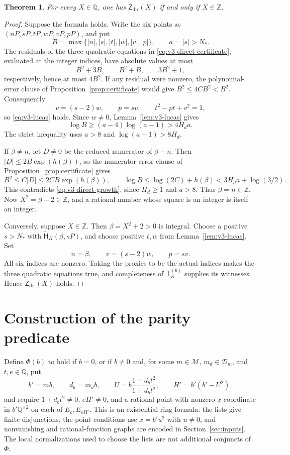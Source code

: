 \documentclass[11pt]{article}
\newtheorem{theorem}{Theorem}[section]
\theoremstyle{definition}\newtheorem{inputthm}[theorem]{Hypothesis}
\theoremstyle{remark}\newtheorem{remark}[theorem]{Remark}
\newcommand{\Q}{\mathbb Q}\newcommand{\Z}{\mathbb Z}
\begin{document}
\begin{theorem}\label{thm:v3-direct}
For every $X\in\Q$, one has $\mathsf Z_{\mathrm{dir}}(X)$ if and only
if $X\in\Z$.
\end{theorem}
\begin{proof}
Suppose the formula holds. Write the six points as
$(nP,sP,tP,wP,vP,pP)$, and put
\[
               B=\max\{|n|,|s|,|t|,|w|,|v|,|p|\},
               \qquad a=|s|>N_*.
\]
The residuals of the three quadratic equations in
\eqref{eq:v3-direct-certificate}, evaluated at the integer indices,
have absolute values at most
\[
                         B^2+3B,\qquad B^2+B,\qquad3B^2+1,
\]
respectively, hence at most $4B^2$. If any residual were nonzero,
the polynomial-error clause of Proposition~\ref{prop:certificate}
would give $B^2\le4CB^2<B^2$. Consequently
\[
                  v=(s-2)w,\qquad p=sv,\qquad t^2-pt+v^2=1,
\]
so \eqref{eq:v3-lucas} holds. Since $w\ne0$, Lemma~\ref{lem:v3-lucas}
gives
\begin{equation}\label{eq:v3-direct-growth}
              \log B\ge(a-4)\log(a-1)>4H_da.
\end{equation}
The strict inequality uses $a>8$ and $\log(a-1)>8H_d$.

If $\beta\ne n$, let $D\ne0$ be the reduced numerator of
$\beta-n$. Then $|D|\le2B\exp(h(\beta))$, so the numerator-error
clause of Proposition~\ref{prop:certificate} gives
\[
 B^2\le C|D|\le2CB\exp(h(\beta)),\qquad
 \log B\le\log(2C)+h(\beta)<3H_da+\log(3/2).
\]
This contradicts \eqref{eq:v3-direct-growth}, since $H_d\ge1$ and
$a>8$. Thus $\beta=n\in\Z$. Now $X^2=\beta-2\in\Z$, and a rational
number whose square is an integer is itself an integer.

Conversely, suppose $X\in\Z$. Then $\beta=X^2+2>0$ is integral.
Choose a positive $s>N_*$ with
$\widetilde{\mathsf H}_K(\beta,sP)$, and choose positive $t,w$ from
Lemma~\ref{lem:v3-lucas}. Set
\[
                   n=\beta,\qquad v=(s-2)w,\qquad p=sv.
\]
All six indices are nonzero. Taking the proxies to be the actual
indices makes the three quadratic equations true, and completeness
of $\mathsf T_K^{(6)}$ supplies its witnesses. Hence
$\mathsf Z_{\mathrm{dir}}(X)$ holds.
\end{proof}

\appendix
\section{Construction of the parity predicate}\label{app:parity}
Define $\Phi(b)$ to hold if $b=0$, or if $b\ne0$ and, for some
$m\in\mathcal M$, $m_d\in\mathcal D_m$, and $t,e\in\Q$, put
\begin{equation}\label{eq:restricted-phi}
 b'=mb,\qquad d_b=m_db,\qquad
 U=b\frac{1-d_bt^2}{1+d_bt^2},\qquad H'=b'(b'-U^2),
\end{equation}
and require $1+d_bt^2\ne0$, $eH'\ne0$, and a rational point with
nonzero $x$-coordinate in $b'\Q^{\times2}$ on each of
$E_e,E_{eH'}$. This is an existential ring formula: the lists give
finite disjunctions, the point conditions use $x=b'u^2$ with $u\ne0$,
and nonvanishing and rational-function graphs are encoded in Section~\ref{sec:inputs}.
The local normalizations used to choose the lists are not additional
conjuncts of $\Phi$.
\end{document}
